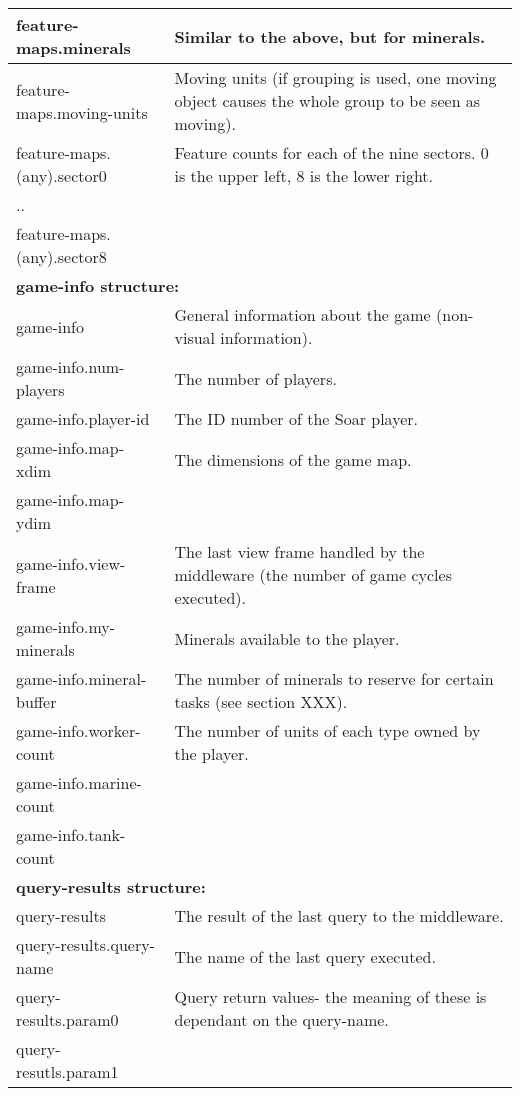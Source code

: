 \begin{center}
\begin{tabular}{|l|p{4.0in}|}
\hline
feature-maps.minerals & Similar to the above, but for minerals.\\
\hline
feature-maps.moving-units & Moving units (if grouping is used, one moving object causes the whole group to be seen as moving).\\
\hline
feature-maps.(any).sector0 & Feature counts for each of the nine sectors. 0 is the upper left, 8 is the lower right.\\
.. & \\
feature-maps.(any).sector8 & \\
\hline
\multicolumn{2}{|l|}{\textbf{game-info structure:}}\\ 
\hline
game-info & General information about the game (non-visual information).\\
\hline
game-info.num-players & The number of players.\\
\hline
game-info.player-id & The ID number of the Soar player.\\
\hline
game-info.map-xdim & The dimensions of the game map. \\
game-info.map-ydim & \\
\hline
game-info.view-frame & The last view frame handled by the middleware (the number of game cycles executed).\\
\hline
game-info.my-minerals & Minerals available to the player. \\
\hline
game-info.mineral-buffer & The number of minerals to reserve for certain tasks (see section XXX).\\
\hline
game-info.worker-count & The number of units of each type owned by the player. \\
game-info.marine-count & \\
game-info.tank-count & \\
\hline
\multicolumn{2}{|l|}{\textbf{query-results structure:}}\\ 
\hline
query-results & The result of the last query to the middleware.\\
\hline
query-results.query-name & The name of the last query executed.\\
\hline
query-results.param0 & Query return values- the meaning of these is dependant on the query-name. \\
query-resutls.param1 & \\
\hline

\end{tabular}


\end{center}
